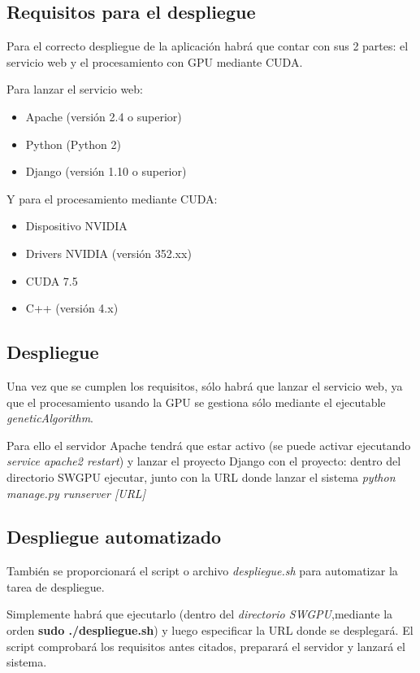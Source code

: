 \subsection{Requisitos para el despliegue}
\bigskip

Para el correcto despliegue de la aplicación habrá que contar con sus 2 partes: el servicio web y el procesamiento con GPU mediante CUDA.

\bigskip
Para lanzar el servicio web:
\begin{itemize}
	\item Apache (versión 2.4 o superior)
	\item Python (Python 2)
	\item Django  (versión 1.10 o superior)
\end{itemize} 

\bigskip
Y para el procesamiento mediante CUDA:
\begin{itemize}
	\item Dispositivo NVIDIA
	\item Drivers NVIDIA (versión 352.xx)
	\item CUDA 7.5
	\item C++ (versión 4.x)
\end{itemize} 

\subsection{Despliegue}
\bigskip


Una vez que se cumplen los requisitos, sólo habrá que lanzar el servicio web, ya que el procesamiento usando la GPU se gestiona sólo mediante el ejecutable \textit{geneticAlgorithm}.

Para ello el servidor Apache tendrá que estar activo (se puede activar ejecutando \textit{service apache2 restart}) y lanzar el proyecto Django con el proyecto: dentro del directorio SWGPU ejecutar, junto con la URL donde lanzar el sistema \textit{python manage.py runserver [URL]}


\subsection{Despliegue automatizado}
\bigskip
También se proporcionará el script o archivo \textit{despliegue.sh} para automatizar la tarea de despliegue.

Simplemente habrá que ejecutarlo (dentro del \textit{directorio SWGPU},mediante la orden \textbf{sudo ./despliegue.sh}) y luego especificar la URL donde se desplegará. El script comprobará los requisitos antes citados, preparará el servidor y lanzará el sistema.

